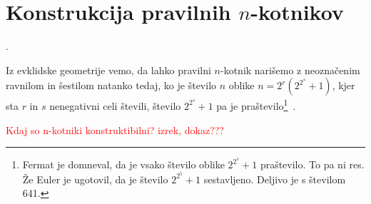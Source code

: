 \section{Konstrukcija pravilnih $n$-kotnikov}.

Iz evklidske geometrije vemo, da lahko pravilni $n$-kotnik narišemo z neoznačenim ravnilom in šestilom natanko tedaj, ko je število $n$ oblike $ n = 2^r(2^{2^s} + 1) $, kjer sta $r$ in $s$ nenegativni celi števili, število $2^{2^s} + 1$ pa je praštevilo\footnote{Fermat je domneval, da je vsako število oblike $2^{2^s} + 1$ praštevilo. To pa ni res. Že Euler je ugotovil, da je število $2^{2^5} + 1$ sestavljeno. Deljivo je s številom 641.}~\cite[str.\ 78]{jerman1998}.

\textcolor{red}{Kdaj so n-kotniki konstruktibilni? izrek, dokaz???}
